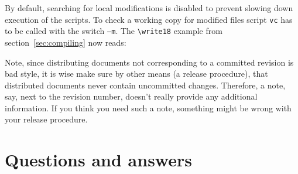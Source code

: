 \documentclass[11pt]{article}
\newlength{\sbslistingwd}
\begin{document}
By default, searching for local modifications is disabled to prevent
slowing down execution of the scripts.  To check a working copy for
modified files script \texttt{vc} has to be called with the switch
\texttt{--m}.  The \verb+\write18+ example from
section~\ref{sec:compiling} now reads:\newline
\begin{minipage}{\textwidth}
  \begin{minipage}[t]{\sbslistingwd}
    \begin{listing}[style=TeX, title=Unix\strut]
\immediate{}

    \end{listing}
  \end{minipage}\hfill
  \begin{minipage}[t]{\sbslistingwd}
    \begin{listing}[style=TeX, title=Windows\strut]
\immediate{}

    \end{listing}
  \end{minipage}
\end{minipage}

Note, since distributing documents not corresponding to a committed
revision is bad style, it is wise make sure by other means (a release
procedure), that distributed documents never contain uncommitted
changes.  Therefore, a note, say, next to the revision number, doesn't
really provide any additional information.  If you think you need such a
note, something might be wrong with your release procedure.



\section{Questions and answers}
\label{sec:qa}

\newcommand*{\qfont}{\sffamily\bfseries}
\newcommand*{\question}[2]{%
  \expandafter\gdef\csname #1\endcsname{#2}%
\item\label{#1}\csname #1\endcsname%
}
\newcommand{\answer}[1]{%
  \medskip\par
  {\noindent\qfont\ref{#1}.~\csname #1\endcsname\par}
  \nobreak\noindent\ignorespaces%
}
\end{document}
